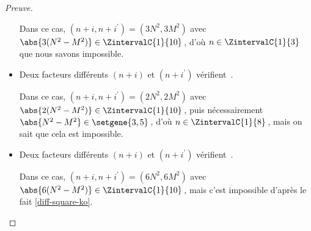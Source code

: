 \begin{proof}[Preuve]
\begin{itemize}
		\smallskip
		\noindent
		Dans ce cas, $(n+i, n+i^\prime) = (3 N^2, 3 M^2)$ avec $\abs{3(N^2 - M^2)} \in \ZintervalC{1}{10}$\,, d'où $n \in \ZintervalC{1}{3}$ que nous savons impossible.

    	\medskip
		\item Deux facteurs différents $(n+i)$ et $(n+i^\prime)$ vérifient \,.
		
		\smallskip
		\noindent
		Dans ce cas, $(n+i, n+i^\prime) = (2 N^2, 2 M^2)$ avec $\abs{2(N^2 - M^2)} \in \ZintervalC{1}{10}$\,, puis nécessairement $\abs{N^2 - M^2} \in \setgene{3, 5}$\,, d'où $n \in \ZintervalC{1}{8}$\,, mais on sait que cela est impossible.


    	\medskip
		\item Deux facteurs différents $(n+i)$ et $(n+i^\prime)$ vérifient \,.
		
		\smallskip
		\noindent
		Dans ce cas, $(n+i, n+i^\prime) = (6 N^2, 6 M^2)$ avec $\abs{6(N^2 - M^2)} \in \ZintervalC{1}{10}$\,, mais c'est impossible d'après le fait \ref{diff-square-ko}.
		\qedhere
    \end{itemize}
\end{proof}

